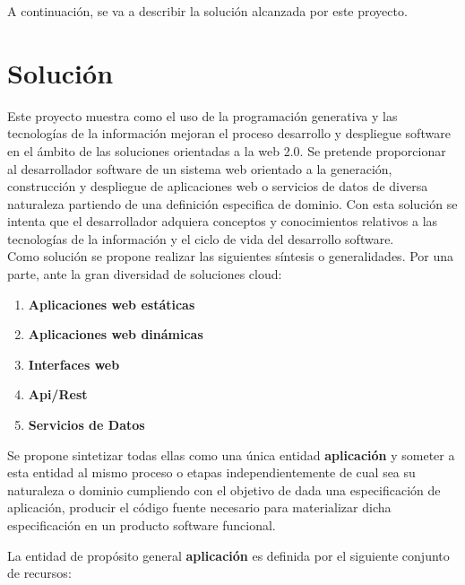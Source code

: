 \documentclass[a4paper,11pt]{book}
\begin{document}
A continuación, se va a describir la solución alcanzada por este proyecto. 

\section{Solución}

Este proyecto muestra como el uso de la programación generativa y las tecnologías de la información mejoran el proceso desarrollo y despliegue software en el ámbito de las soluciones orientadas a la web 2.0. Se pretende proporcionar al desarrollador software de un sistema web orientado a la generación, construcción y despliegue de aplicaciones web o servicios de datos de diversa naturaleza partiendo de una definición especifica de dominio. Con esta solución se intenta que el desarrollador adquiera conceptos y conocimientos relativos a las tecnologías de la información y el ciclo de vida del desarrollo software.  \\

Como solución se propone realizar las siguientes síntesis o generalidades.  Por una parte, ante la gran diversidad de soluciones cloud: 

\begin{enumerate}
\item \textbf{ Aplicaciones web estáticas }
\item \textbf{ Aplicaciones web dinámicas}
\item \textbf{ Interfaces web }
\item \textbf{ Api/Rest }
\item \textbf{ Servicios de Datos }
\end{enumerate}

Se propone sintetizar todas ellas  como una única  entidad \textbf{aplicación} y  someter a esta entidad al mismo proceso o etapas independientemente de cual sea su naturaleza o dominio cumpliendo con el objetivo de dada una especificación de aplicación, producir el código fuente necesario para materializar dicha especificación en un producto software funcional. 



La entidad de propósito general \textbf{aplicación} es definida por el siguiente conjunto de recursos:    
\end{document}
